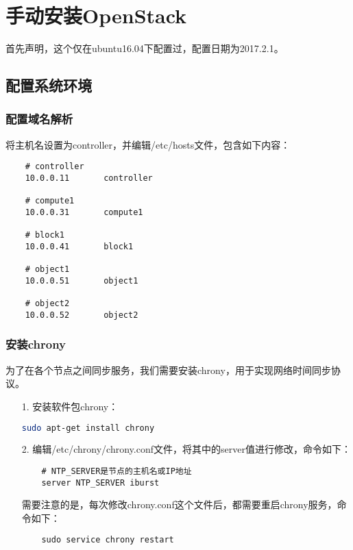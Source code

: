 \documentclass[a4paper,left=2.5cm,right=2.5cm,11pt]{article}
\begin{document}

\clearpage

\section{手动安装OpenStack}
	首先声明，这个仅在ubuntu16.04下配置过，配置日期为2017.2.1。\par

\subsection{配置系统环境}
\subsubsection{配置域名解析}
	将主机名设置为controller，并编辑/etc/hosts文件，包含如下内容：
	\begin{lstlisting}
	# controller
	10.0.0.11       controller

	# compute1
	10.0.0.31       compute1

	# block1
	10.0.0.41       block1

	# object1
	10.0.0.51       object1

	# object2
	10.0.0.52       object2
	\end{lstlisting}

\subsubsection{安装chrony}
	为了在各个节点之间同步服务，我们需要安装chrony，用于实现网络时间同步协议。
	\begin{itemize}
		\item[1.] 安装软件包chrony：
		\begin{lstlisting}[language = bash]
	sudo apt-get install chrony
		\end{lstlisting}

		\item[2.] 编辑/etc/chrony/chrony.conf文件，将其中的server值进行修改，命令如下：
		\begin{lstlisting}
	# NTP_SERVER是节点的主机名或IP地址
	server NTP_SERVER iburst
		\end{lstlisting}

		需要注意的是，每次修改chrony.conf这个文件后，都需要重启chrony服务，命令如下：
		\begin{lstlisting}
	sudo service chrony restart
		\end{lstlisting}
	\end{itemize}
\end{document}
